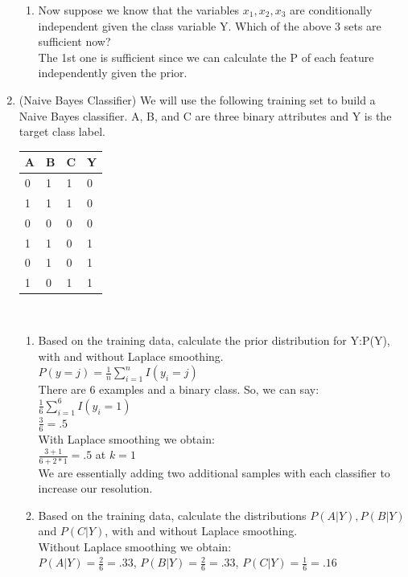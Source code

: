 \documentclass[12pt,letterpaper]{article}
\begin{document}
\begin{enumerate}
\begin{enumerate}
		\item Now suppose we know that the variables $x_{1},x_{2},x_{3}$ are conditionally independent given the class variable Y. Which of the above 3 sets are sufficient now? \\
		The 1st one is sufficient since we can calculate the P of each feature independently given the prior.\\
	\end{enumerate} 
	\item (Naive Bayes Classifier) We will use the following training set to build a Naive Bayes classifier. A, B, and C are three binary attributes and Y is the target class label. \\[10mm]
	\centering
	\begin{tabular}{| l | l | l | l |} 
	\hline
	A & B & C & Y \\ \hline 
	0 & 1 & 1 & 0 \\ \hline
	1 & 1 & 1 & 0 \\ \hline
	0 & 0 & 0 & 0 \\ \hline
	1 & 1 & 0 & 1 \\ \hline
	0 & 1 & 0 & 1 \\ \hline
	1 & 0 & 1 & 1 \\ \hline 
	\end{tabular} \\[15mm]
	\begin{enumerate} 
		\item Based on the training data, calculate the prior distribution for Y:P(Y), with and without Laplace smoothing. \\
		$P(y = j) = \frac{1}{n} \sum_{i=1}^{n} I(y_{i} = j)$ \\
		There are 6 examples and a binary class. So, we can say: \\
		$\frac{1}{6} \sum_{i=1}^{6} I(y_{i} = 1)$ \\
		$\frac{3}{6} = .5$ \\
		With Laplace smoothing we obtain: \\
		$\frac{3+1}{6+2*1} = .5$ at $ k = 1$ \\ 
		We are essentially adding two additional samples with each classifier to increase our resolution. \\ 
		\item Based on the training data, calculate the distributions $P(A|Y), P(B|Y)$ and $P(C|Y)$, with and without Laplace smoothing. \\
		Without Laplace smoothing we obtain: \\
		$P(A|Y) = \frac{2}{6} = .33$, $P(B|Y) = \frac{2}{6} = .33$, $P(C|Y) = \frac{1}{6} = .16$ \\

\end{enumerate}
\end{enumerate}
\end{document}
